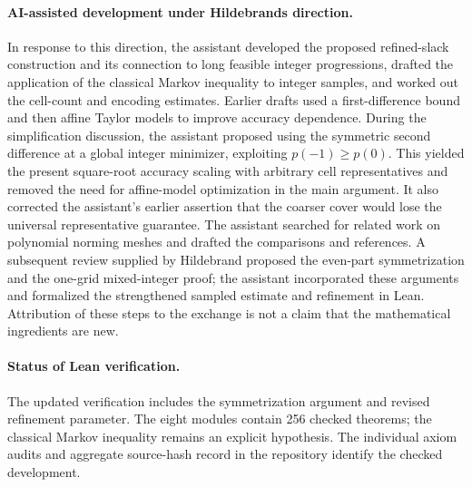 \documentclass[11pt]{article}
\theoremstyle{definition}\newtheorem{definition}{Definition}[section]
\theoremstyle{remark}\newtheorem{remark}[theorem]{Remark}
\begin{document}
\paragraph{AI-assisted development under Hildebrand\textquotesingle s direction.}
In response to this direction, the assistant developed the proposed refined-slack construction and its connection to long feasible integer progressions, drafted the application of the classical Markov inequality to integer samples, and worked out the cell-count and encoding estimates. Earlier drafts used a first-difference bound and then affine Taylor models to improve accuracy dependence. During the simplification discussion, the assistant proposed using the symmetric second difference at a global integer minimizer, exploiting $p(-1)\ge p(0)$. This yielded the present square-root accuracy scaling with arbitrary cell representatives and removed the need for affine-model optimization in the main argument. It also corrected the assistant's earlier assertion that the coarser cover would lose the universal representative guarantee. The assistant searched for related work on polynomial norming meshes and drafted the comparisons and references. A subsequent review supplied by Hildebrand proposed the even-part symmetrization and the one-grid mixed-integer proof; the assistant incorporated these arguments and formalized the strengthened sampled estimate and refinement in Lean. Attribution of these steps to the exchange is not a claim that the mathematical ingredients are new.

\paragraph{Status of Lean verification.}
The updated verification includes the symmetrization argument and revised refinement parameter. The eight modules contain 256 checked theorems; the classical Markov inequality remains an explicit hypothesis. The individual axiom audits and aggregate source-hash record in the repository identify the checked development.
\end{document}
